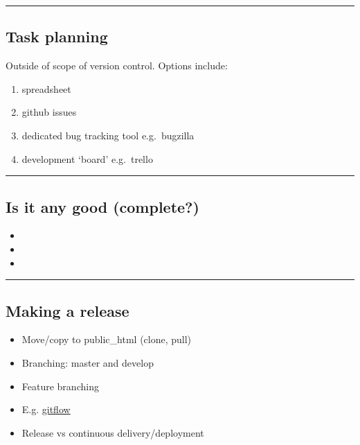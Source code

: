 \begin{center}\rule{0.5\linewidth}{\linethickness}\end{center}

\hypertarget{task-planning}{%
\subsection{Task planning}\label{task-planning}}

Outside of scope of version control. Options include:

\begin{enumerate}
\def\labelenumi{\arabic{enumi}.}
\tightlist
\item
  spreadsheet
\item
  github issues
\item
  dedicated bug tracking tool e.g.~bugzilla
\item
  development `board' e.g.~trello
\end{enumerate}

\begin{center}\rule{0.5\linewidth}{\linethickness}\end{center}

\hypertarget{is-it-any-good-complete}{%
\subsection{Is it any good (complete?)}\label{is-it-any-good-complete}}

\begin{itemize}
\item
\item
\item
\end{itemize}

\begin{center}\rule{0.5\linewidth}{\linethickness}\end{center}

\hypertarget{making-a-release}{%
\subsection{Making a release}\label{making-a-release}}

\begin{itemize}
\tightlist
\item
  Move/copy to public\_html (clone, pull)
\item
  Branching: master and develop
\item
  Feature branching
\item
  E.g.
  \href{https://www.atlassian.com/git/tutorials/comparing-workflows/gitflow-workflow}{gitflow}
\item
  Release vs continuous delivery/deployment
\end{itemize}

